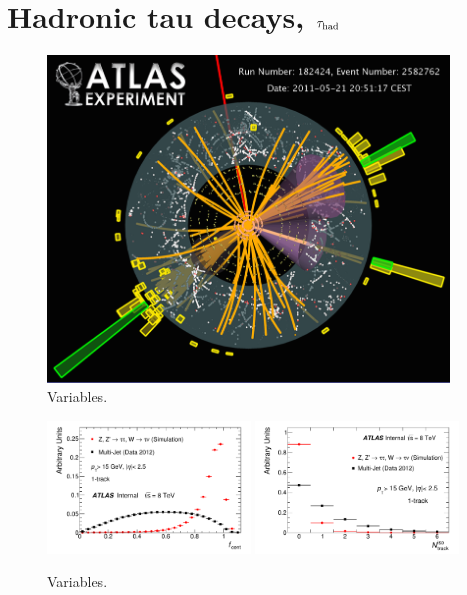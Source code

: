 \section{Hadronic tau decays, $\tau_\text{had}$}
\label{sec:taus-jetfakes}

\begin{figure}[tp]
  \centering
  \includegraphics[width=0.95\textwidth]{figures/tauperformance/vp1_3dcocktail_run182424_evt2582762_tttaumu}
  \caption{Variables.}
  \label{fig:taus-eventdisplay}
\end{figure}

\begin{figure}[tp]
  \centering
  \includegraphics[width=0.48\textwidth]{figures/PERF-2013-06_tmp/centFrac_1p}
  \includegraphics[width=0.48\textwidth]{figures/PERF-2013-06_tmp/wideTrk_n_1p}
  \caption{Variables.}
  \label{fig:taus-id1p}
\end{figure}

